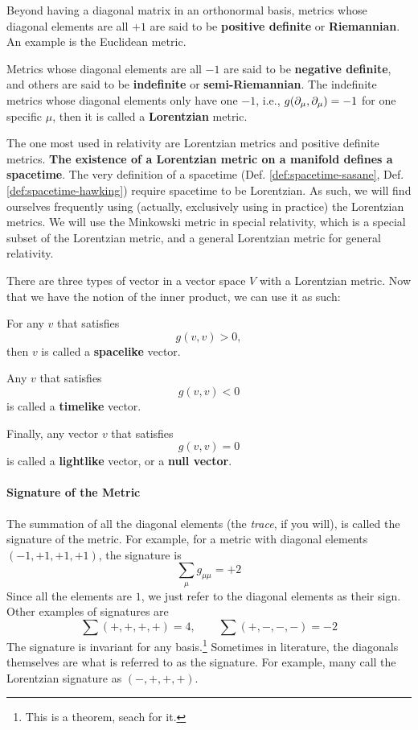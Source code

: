		Beyond having a diagonal matrix in an orthonormal basis, metrics 
		whose diagonal elements are all $+1$ are said to be \textbf{positive definite}
		or \textbf{Riemannian}. An example is the Euclidean metric. 

		Metrics whose 
		diagonal elements are all $-1$ are said to be \textbf{negative definite},
		and others are said to be \textbf{indefinite} or \textbf{semi-Riemannian}. 
		The indefinite metrics whose diagonal elements only have one $-1$, i.e., $g(\partial_\mu,\partial_\mu)=-1$
		for one specific $\mu$, then it is called a \textbf{Lorentzian} metric. 

		The one most used in relativity are Lorentzian metrics and positive definite metrics.
		\textbf{The existence of a Lorentzian metric on a manifold defines a spacetime}. The very definition
		of a spacetime (Def. \ref{def:spacetime-sasane}, Def. \ref{def:spacetime-hawking}) require 
		spacetime to be Lorentzian.
		As such, we will find ourselves frequently using (actually, exclusively using in practice)
		the Lorentzian metrics. We will use the Minkowski metric in special relativity, which 
		is a special subset of the Lorentzian metric, and a general Lorentzian metric for general 
		relativity.

		There are three types of vector in a vector space $V$ with a Lorentzian metric. Now
		that we have the notion of the inner product, we can use it as such:

		For any $v$ that satisfies
		\[
			g(v,v) > 0,
		\]
		then $v$ is called a \textbf{spacelike} vector. 

		Any $v$ that satisfies
		\[
			g(v,v) < 0
		\]
		is called a \textbf{timelike} vector. 

		Finally, any vector $v$ that satisfies 
		\[
			g(v,v) = 0
		\]
		is called a \textbf{lightlike} vector, or a \textbf{null vector}.

	\paragraph{Signature of the Metric}
		The summation of all the diagonal elements (the \textit{trace}, if you will),
		is called the signature of the metric. For example, for a metric
		with diagonal elements $(-1,+1,+1,+1)$, the signature is
		\[
			\sum_\mu g_{\mu\mu} = +2
		\]
		Since all the elements are $1$, we just refer to the diagonal 
		elements as their sign. Other examples of signatures are
		\[
			\sum (+,+,+,+)=4, \qquad \sum (+,-,-,-)=-2
		\]
		The signature is invariant for any basis.\footnote{This is a theorem, seach for it.}
		Sometimes in literature, the diagonals themselves are what is referred to as the signature.
		For example, many call the Lorentzian signature as $(-,+,+,+)$.

